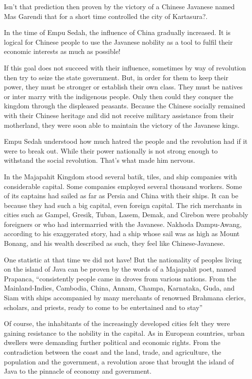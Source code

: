Isn't that prediction then proven by the victory of a Chinese Javanese 
named Mas Garendi that for a short time controlled the city of Kartasura?.\nline

In the time of Empu Sedah, the influence of China gradually increased.
It is logical for Chinese people to use the Javanese nobility as a tool to fulfil 
their economic interests as much as possible!\nline

If this goal does not succeed with their influence, sometimes by way of revolution then 
try to seize the state government. But, in order for them to keep their power, they must be 
stronger or establish their own class. They must be natives or inter marry with the indigenous 
people. Only then could they conquer the kingdom through the displeased peasants. Because the 
Chinese socially remained with their Chinese heritage and did not receive military assistance 
from their motherland, they were soon able to maintain the victory of the Javanese kings.\nline

Empu Sedah understood how much hatred the people and the revolution had if it were to break 
out. While their power nationally is not strong enough to withstand the social revolution. That's what made him nervous.\nline

In the Majapahit Kingdom stood several batik, tiles, and ship companies with considerable capital. 
Some companies employed several thousand workers. Some of its captains had sailed as far as Persia 
and China with their ships. It can be because they had such a big capital, even foreign capital. 
The rich merchants in cities such as Gampel, Gresik, Tuban, Lasem, Demak, and Cirebon were probably 
foreigners or who had intermarried with the Javanese. Nakhoda Dampu-Awang, according to his exaggerated 
story, had a ship whose sail was as high as Mount Bonang, and his wealth described as such, they feel like Chinese-Javanese.\nline

One statistic at that time we did not have! But the nationality of peoples living on the island of Java can 
be proven by the words of a Majapahit poet, named Prapanca, “consistently people came in droves from various nations. 
From the Mainland-Indies, Cambodia, China, Annam, Champa, Karnataka, Guda, and Siam with ships accompanied by many merchants of 
renowned Brahmana clerics, scholars, and priests, ready to come to be entertained and to stay”\nline

Of course, the inhabitants of the increasingly developed cities felt they were gaining resistance to the nobility in 
the capital. As in European countries, urban dwellers were demanding further political and economic rights. From 
the contradiction between the coast and the land, trade, and agriculture, the population and the government, 
a revolution arose that brought the island of Java to the pinnacle of economy and government.\nline

